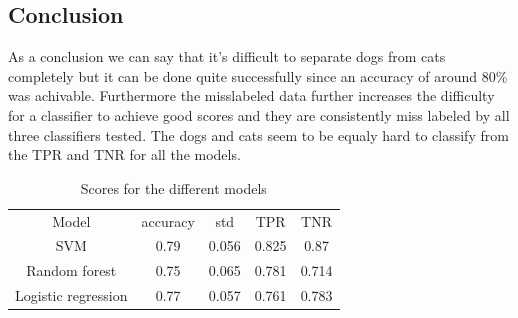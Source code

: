 \documentclass{article}
\begin{document}
\subsection{Conclusion}
As a conclusion we can say that it's difficult to separate dogs from cats completely but it can be done quite successfully since an accuracy of around 80\% was achivable. Furthermore the misslabeled data further increases the difficulty for a classifier to achieve good scores and they are consistently miss labeled by all three classifiers tested. The dogs and cats seem to be equaly hard to classify from the TPR and TNR for all the models.  
\begin{table}[H]
    \centering
    \begin{tabular}{c|c|c|c|c}
        Model & accuracy & std & TPR & TNR \\
         SVM & 0.79 & 0.056 & 0.825 & 0.87 \\
         Random forest & 0.75 & 0.065 & 0.781 & 0.714 \\
         Logistic regression & 0.77 & 0.057 & 0.761 & 0.783
    \end{tabular}
    \caption{Scores for the different models}
    \label{score}
\end{table}
\end{document}
